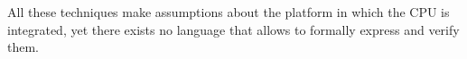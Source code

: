 All these techniques make assumptions about the platform in which the CPU is integrated, yet there exists no language that allows to formally express and verify them.






